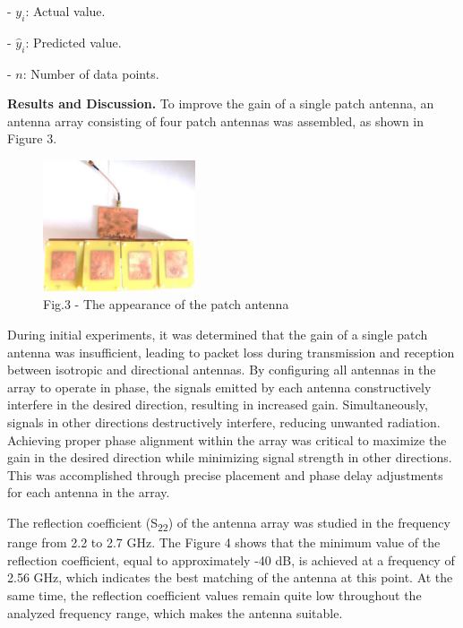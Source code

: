 \begin{multicols}{2}
- \(y_{i}\): Actual value.

- \({\widehat{y}}_{i}\): Predicted value.

- \(n\): Number of data points.

{\bfseries Results and Discussion.} To improve the gain of a single patch
antenna, an antenna array consisting of four patch antennas was
assembled, as shown in Figure 3.

\begin{figure}[H]
	\centering
	\includegraphics[width=0.4\textwidth]{media/ict/image43}
	\caption*{Fig.3 - The appearance of the patch antenna}
\end{figure}

During initial experiments, it was determined that the gain of a single
patch antenna was insufficient, leading to packet loss during
transmission and reception between isotropic and directional antennas.
By configuring all antennas in the array to operate in phase, the
signals emitted by each antenna constructively interfere in the desired
direction, resulting in increased gain. Simultaneously, signals in other
directions destructively interfere, reducing unwanted radiation.
Achieving proper phase alignment within the array was critical to
maximize the gain in the desired direction while minimizing signal
strength in other directions. This was accomplished through precise
placement and phase delay adjustments for each antenna in the array.

The reflection coefficient (S\textsubscript{22}) of the antenna array
was studied in the frequency range from 2.2 to 2.7 GHz. The Figure 4
shows that the minimum value of the reflection coefficient, equal to
approximately -40 dB, is achieved at a frequency of 2.56 GHz, which
indicates the best matching of the antenna at this point. At the same
time, the reflection coefficient values \hspace{0pt}\hspace{0pt}remain
quite low throughout the analyzed frequency range, which makes the
antenna suitable.
\end{multicols}


